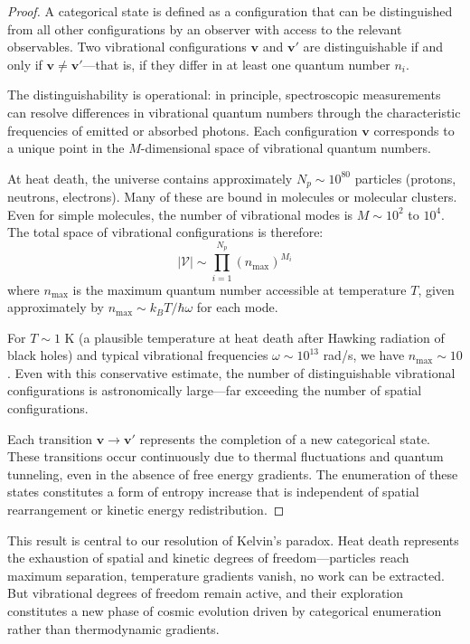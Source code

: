 \documentclass[12pt,a4paper]{article}
\theoremstyle{definition}
\theoremstyle{remark}
\begin{document}
\begin{proof}
A categorical state is defined as a configuration that can be distinguished from all other configurations by an observer with access to the relevant observables. Two vibrational configurations $\mathbf{v}$ and $\mathbf{v}'$ are distinguishable if and only if $\mathbf{v} \neq \mathbf{v}'$—that is, if they differ in at least one quantum number $n_i$.

The distinguishability is operational: in principle, spectroscopic measurements can resolve differences in vibrational quantum numbers through the characteristic frequencies of emitted or absorbed photons. Each configuration $\mathbf{v}$ corresponds to a unique point in the $M$-dimensional space of vibrational quantum numbers.

At heat death, the universe contains approximately $N_p \sim 10^{80}$ particles (protons, neutrons, electrons). Many of these are bound in molecules or molecular clusters. Even for simple molecules, the number of vibrational modes is $M \sim 10^2$ to $10^4$. The total space of vibrational configurations is therefore:
\begin{equation}
|\mathcal{V}| \sim \prod_{i=1}^{N_p} (n_{\text{max}})^{M_i}
\end{equation}
where $n_{\text{max}}$ is the maximum quantum number accessible at temperature $T$, given approximately by $n_{\text{max}} \sim k_B T / \hbar\omega$ for each mode.

For $T \sim 1$ K (a plausible temperature at heat death after Hawking radiation of black holes) and typical vibrational frequencies $\omega \sim 10^{13}$ rad/s, we have $n_{\text{max}} \sim 10$. Even with this conservative estimate, the number of distinguishable vibrational configurations is astronomically large—far exceeding the number of spatial configurations.

Each transition $\mathbf{v} \to \mathbf{v}'$ represents the completion of a new categorical state. These transitions occur continuously due to thermal fluctuations and quantum tunneling, even in the absence of free energy gradients. The enumeration of these states constitutes a form of entropy increase that is independent of spatial rearrangement or kinetic energy redistribution.
\end{proof}

This result is central to our resolution of Kelvin's paradox. Heat death represents the exhaustion of spatial and kinetic degrees of freedom—particles reach maximum separation, temperature gradients vanish, no work can be extracted. But vibrational degrees of freedom remain active, and their exploration constitutes a new phase of cosmic evolution driven by categorical enumeration rather than thermodynamic gradients.
\end{document}

